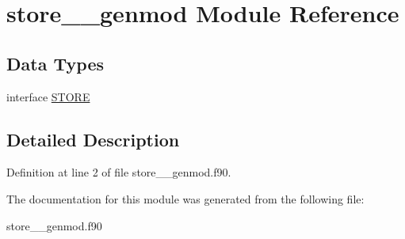 \hypertarget{classstore____genmod}{\section{store\+\_\+\+\_\+genmod Module Reference}
\label{classstore____genmod}
}
\subsection*{Data Types}
\begin{DoxyCompactItemize}
\item 
interface \hyperlink{interfacestore____genmod_1_1_s_t_o_r_e}{S\+T\+O\+R\+E}
\end{DoxyCompactItemize}


\subsection{Detailed Description}


Definition at line 2 of file store\+\_\+\+\_\+genmod.\+f90.



The documentation for this module was generated from the following file\+:\begin{DoxyCompactItemize}
\item 
store\+\_\+\+\_\+genmod.\+f90\end{DoxyCompactItemize}
